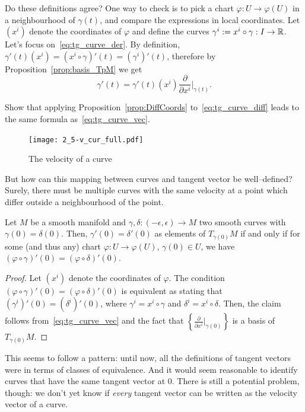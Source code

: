 Do these definitions agree?
One way to check is to pick a chart $\varphi: U \to \varphi(U)$ in a neighbourhood of $\gamma(t)$, and compare the expressions in local coordinates. Let $(x^i)$ denote the coordinates of $\varphi$ and define the curves $\gamma^i := x^i \circ \gamma : I\to\mathbb{R}$.
Let's focus on~\eqref{eq:tg_curve_der}. By definition, $\gamma'(t)(x^i) = (x^i\circ\gamma)'(t) = (\gamma^i)'(t)$, therefore by Proposition~\ref{prop:basis_TpM} we get
\begin{equation}\label{eq:tg_curve_vec}
  \gamma'(t) = %
  \gamma'(t)(x^i) \frac{\partial}{\partial x^i}\Big|_{\gamma(t)}.
\end{equation}
\begin{exercise}
  Show that applying Proposition~\ref{prop:DiffCoords} to~\eqref{eq:tg_curve_diff} leads to the same formula as~\eqref{eq:tg_curve_vec}.
\end{exercise}

\begin{figure}[htp]
  \centering
  \texttt{[image: 2\_5-v\_cur\_full.pdf]}
  \caption{The velocity of a curve}
  \label{fig:2_5-v_cur_full}
\end{figure}

But how can this mapping between curves and tangent vector be well--defined?
Surely, there must be multiple curves with the same velocity at a point which differ outside a neighbourhood of the point.

\begin{lemma}\label{lem:equiv_tg_curves}
  Let $M$ be a smooth manifold and $\gamma, \delta : (-\epsilon, \epsilon) \to M$ two smooth curves with $\gamma(0) = \delta(0)$. Then, $\gamma'(0) = \delta'(0)$ as elements of $T_{\gamma(0)}M$ if and only if for some (and thus any) chart $\varphi:U\to\varphi(U)$, $\gamma(0)\in U$, we have $(\varphi\circ \gamma)'(0) = (\varphi\circ\delta)'(0)$.
\end{lemma}
\begin{proof}
  Let $(x^i)$ denote the coordinates of $\varphi$. The condition $(\varphi\circ \gamma)'(0) = (\varphi\circ\delta)'(0)$ is equivalent as stating that $(\gamma^i)'(0) = (\delta^i)'(0)$, where $\gamma^i = x^i\circ\gamma$ and $\delta^i=x^i\circ\delta$. Then, the claim follows from~\eqref{eq:tg_curve_vec} and the fact that $\left\{\frac{\partial}{\partial x^i}\big|_{\gamma(0)}\right\}$ is a basis of $T_{\gamma(0)}M$.
\end{proof}

This seems to follow a pattern: until now, all the definitions of tangent vectors were in terms of classes of equivalence.
And it would seem reasonable to identify curves that have the same tangent vector at $0$.
There is still a potential problem, though: we don't yet know if \emph{every} tangent vector can be written as the velocity vector of a curve.

